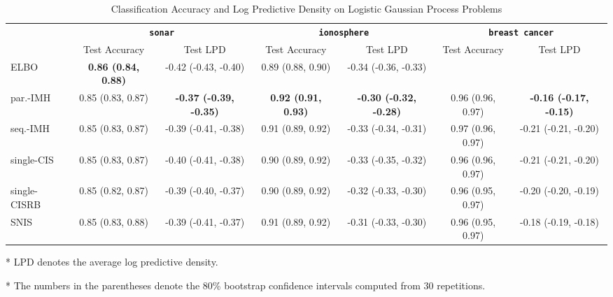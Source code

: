 
\begin{table*}
  \centering
  \caption{Classification Accuracy and Log Predictive Density on Logistic Gaussian Process Problems}\label{table:gp}
  \setlength{\tabcolsep}{3pt}
  \begin{threeparttable}
  \begin{tabular}{lcccccc}
    \toprule
     & \multicolumn{2}{c}{\textbf{\texttt{sonar}}} & \multicolumn{2}{c}{\textbf{\texttt{ionosphere}}} & \multicolumn{2}{c}{\textbf{\texttt{breast cancer}}} \\
    \cmidrule(lr){2-3}\cmidrule(lr){4-5}\cmidrule(lr){6-7}
    & Test Accuracy & Test LPD
    & Test Accuracy & Test LPD
    & Test Accuracy & Test LPD \\\midrule
    ELBO & \textbf{0.86 {\scriptsize(0.84, 0.88)}} & -0.42 {\scriptsize(-0.43, -0.40)} & 0.89 {\scriptsize(0.88, 0.90)} & -0.34 {\scriptsize(-0.36, -0.33)} &  \\\arrayrulecolor{black!30}\midrule
    par.-IMH & 0.85 {\scriptsize(0.83, 0.87)} & \textbf{-0.37 {\scriptsize(-0.39, -0.35)}} & \textbf{0.92 {\scriptsize(0.91, 0.93)}} & \textbf{-0.30 {\scriptsize(-0.32, -0.28)}} & 0.96 {\scriptsize(0.96, 0.97)} & \textbf{-0.16 {\scriptsize(-0.17, -0.15)}} \\
    seq.-IMH & 0.85 {\scriptsize(0.83, 0.87)} & -0.39 {\scriptsize(-0.41, -0.38)} & 0.91 {\scriptsize(0.89, 0.92)} & -0.33 {\scriptsize(-0.34, -0.31)} & 0.97 {\scriptsize(0.96, 0.97)} & -0.21 {\scriptsize(-0.21, -0.20)} \\
    single-CIS & 0.85 {\scriptsize(0.83, 0.87)} & -0.40 {\scriptsize(-0.41, -0.38)} & 0.90 {\scriptsize(0.89, 0.92)} & -0.33 {\scriptsize(-0.35, -0.32)} & 0.96 {\scriptsize(0.96, 0.97)} & -0.21 {\scriptsize(-0.21, -0.20)} \\
    single-CISRB & 0.85 {\scriptsize(0.82, 0.87)} & -0.39 {\scriptsize(-0.40, -0.37)} & 0.90 {\scriptsize(0.89, 0.92)} & -0.32 {\scriptsize(-0.33, -0.30)} & 0.96 {\scriptsize(0.95, 0.97)} & -0.20 {\scriptsize(-0.20, -0.19)} \\
    SNIS & 0.85 {\scriptsize(0.83, 0.88)} & -0.39 {\scriptsize(-0.41, -0.37)} & 0.91 {\scriptsize(0.89, 0.92)} & -0.31 {\scriptsize(-0.33, -0.30)} & 0.96 {\scriptsize(0.95, 0.97)} & -0.18 {\scriptsize(-0.19, -0.18)} \\\bottomrule
  \end{tabular}
  \begin{tablenotes}
    \item[*]{\footnotesize LPD denotes the average log predictive density.}
    \item[*]{\footnotesize The numbers in the parentheses denote the 80\% bootstrap confidence intervals computed from 30 repetitions.}
  \end{tablenotes}
  \end{threeparttable}
\end{table*}

